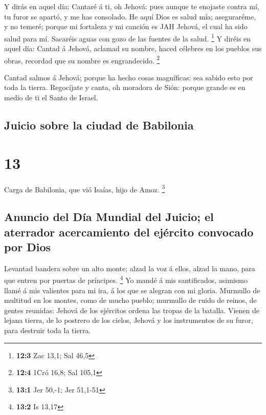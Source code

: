  Y dirás en aquel día: Cantaré á ti, oh Jehová: pues aunque
te enojaste contra mí, tu furor se apartó, y me has consolado.
 He aquí Dios es salud mía; aseguraréme, y no temeré; porque
mi fortaleza y mi canción es JAH Jehová, el cual ha sido salud para mí.
 Sacaréis aguas con gozo de las fuentes de la salud.
\footnote{\textbf{12:3} Zac 13,1; Sal 46,5}  Y diréis en
aquel día: Cantad á Jehová, aclamad su nombre, haced célebres en los
pueblos sus obras, recordad que su nombre es engrandecido. \footnote{\textbf{12:4}
  1Cró 16,8; Sal 105,1}

 Cantad salmos á Jehová; porque ha hecho cosas magníficas:
sea sabido esto por toda la tierra.  Regocíjate y canta, oh
moradora de Sión: porque grande es en medio de ti el Santo de Israel.

\hypertarget{juicio-sobre-la-ciudad-de-babilonia}{%
\subsection{Juicio sobre la ciudad de
Babilonia}\label{juicio-sobre-la-ciudad-de-babilonia}}

\hypertarget{section-12}{%
\section{13}\label{section-12}}

 Carga de Babilonia, que vió Isaías, hijo de Amoz.
\footnote{\textbf{13:1} Jer 50,-1; Jer 51,1-51}

\hypertarget{anuncio-del-duxeda-mundial-del-juicio-el-aterrador-acercamiento-del-ejuxe9rcito-convocado-por-dios}{%
\subsection{Anuncio del Día Mundial del Juicio; el aterrador
acercamiento del ejército convocado por
Dios}\label{anuncio-del-duxeda-mundial-del-juicio-el-aterrador-acercamiento-del-ejuxe9rcito-convocado-por-dios}}

 Levantad bandera sobre un alto monte; alzad la voz á ellos,
alzad la mano, para que entren por puertas de príncipes. \footnote{\textbf{13:2}
  Is 13,17}  Yo mandé á mis santificados, asimismo llamé á
mis valientes para mi ira, á los que se alegran con mi gloria.
 Murmullo de multitud en los montes, como de mucho pueblo;
murmullo de ruido de reinos, de gentes reunidas: Jehová de los ejércitos
ordena las tropas de la batalla.  Vienen de lejana tierra,
de lo postrero de los cielos, Jehová y los instrumentos de su furor,
para destruir toda la tierra.

